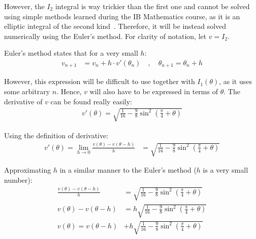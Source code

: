 \documentclass[12pt]{article}
\begin{document}
        However, the $I_2$ integral is way trickier than the first one and cannot be solved using simple methods learned during the IB Mathematics course, as it is an elliptic integral of the second kind~\cite{elliptic_integral}. Therefore, it will be instead solved numerically using the Euler's method. For clarity of notation, let $v = I_2$.

        Euler's method states that for a very small $h$:
        \begin{align}
            v_{n+1} &= v_n + h \cdot v'(\theta_n) \quad , \quad
            \theta_{n+1} = \theta_n +h
        \end{align}

        However, this expression will be difficult to use together with $I_1(\theta)$, as it uses some arbitrary $n$. Hence, $v$ will also have to be expressed in terms of $\theta$. The derivative of $v$ can be found really easily:
        \begin{align}
            v'(\theta) = \sqrt{\frac{1}{16} - \frac{9}{8} \sin^2 (\frac{\pi}{4}+\theta)}
        \end{align}

        Using the definition of derivative:
        \begin{align}
            v'(\theta) = \lim\limits_{h \to 0} \frac{v(\theta)-v(\theta-h)}{h} &= \sqrt{\frac{1}{16} - \frac{9}{8} \sin^2 (\frac{\pi}{4}+\theta)}
        \end{align}

        Approximating $h$ in a similar manner to the Euler's method ($h$ is a very small number):
        \begin{align}
            \frac{v(\theta)-v(\theta-h)}{h} &= \sqrt{\frac{1}{16} - \frac{9}{8} \sin^2 (\frac{\pi}{4}+\theta)} \\
            v(\theta)-v(\theta-h) &= h \sqrt{\frac{1}{16} - \frac{9}{8} \sin^2 (\frac{\pi}{4}+\theta)} \\
            v(\theta) = v(\theta-h) &+ h \sqrt{\frac{1}{16} - \frac{9}{8} \sin^2 (\frac{\pi}{4}+\theta)}
        \end{align}


 
\end{document}
